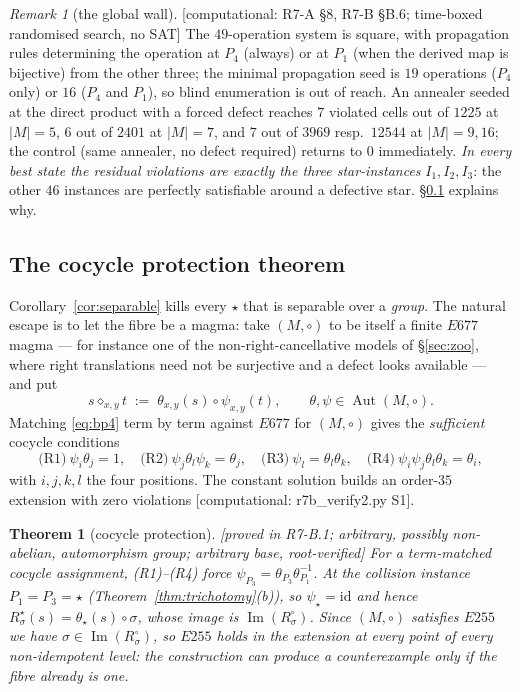 \documentclass[11pt]{article}
\theoremstyle{plain}
\newtheorem{theorem}{Theorem}[section]
\theoremstyle{definition}
\theoremstyle{remark}
\newtheorem*{remark*}{Remark}
\numberwithin{equation}{section}
\newcommand{\Imm}{\operatorname{Im}}
\newcommand{\Aut}{\operatorname{Aut}}
\newcommand{\statusbox}[1]{{\small\sloppy\textsf{[#1]}}}
\newcommand{\PROVED}[1]{\statusbox{proved in #1, root-verified}}
\newcommand{\COMP}[1]{\statusbox{computational: #1}}
\begin{document}
\begin{remark*}[the global wall]
\COMP{R7-A \S8, R7-B \S B.6; time-boxed randomised search, no SAT}
The $49$-operation system is square, with propagation rules determining the
operation at $P_4$ (always) or at $P_1$ (when the derived map is bijective) from
the other three; the minimal propagation seed is $19$ operations ($P_4$ only) or
$16$ ($P_4$ and $P_1$), so blind enumeration is out of reach. An annealer seeded
at the direct product with a forced defect reaches $7$ violated cells out of
$1225$ at $|M|=5$, $6$ out of $2401$ at $|M|=7$, and $7$ out of $3969$ resp.\
$12544$ at $|M| = 9,16$; the control (same annealer, no defect required) returns
to $0$ immediately. \emph{In every best state the residual violations are exactly
the three star-instances} $I_1,I_2,I_3$: the other $46$ instances are perfectly
satisfiable around a defective star. \S\ref{sec:cocycle} explains why.
\end{remark*}

\subsection{The cocycle protection theorem}\label{sec:cocycle}

Corollary~\ref{cor:separable} kills every $\star$ that is separable over a
\emph{group}. The natural escape is to let the fibre be a magma: take $(M,\circ)$
to be itself a finite $E677$ magma --- for instance one of the
non-right-cancellative models of \S\ref{sec:zoo}, where right translations need
not be surjective and a defect looks available --- and put
\[
  s\diamond_{x,y}t \;:=\; \theta_{x,y}(s)\circ\psi_{x,y}(t),
  \qquad \theta,\psi\in\Aut(M,\circ).
\]
Matching \eqref{eq:bp4} term by term against $E677$ for $(M,\circ)$ gives the
\emph{sufficient} cocycle conditions
\[
  \text{(R1)}\ \psi_i\theta_j = 1,\quad
  \text{(R2)}\ \psi_j\theta_l\psi_k = \theta_j,\quad
  \text{(R3)}\ \psi_l = \theta_l\theta_k,\quad
  \text{(R4)}\ \psi_i\psi_j\theta_l\theta_k = \theta_i,
\]
with $i,j,k,l$ the four positions. The constant solution builds an order-$35$
extension with zero violations \COMP{r7b\_verify2.py S1}.

\begin{theorem}[cocycle protection]\label{thm:cocycle}
\PROVED{R7-B.1; arbitrary, possibly non-abelian, automorphism group; arbitrary base}
For a term-matched cocycle assignment, (R1)--(R4) force
$\psi_{P_3} = \theta_{P_3}\theta_{P_1}^{-1}$. At the collision instance
$P_1 = P_3 = \star$ (Theorem~\ref{thm:trichotomy}(b)), so $\psi_\star = \mathrm{id}$
and hence $R^\star_\sigma(s) = \theta_\star(s)\circ\sigma$, whose image is
$\Imm(R^\circ_\sigma)$. Since $(M,\circ)$ satisfies $E255$ we have
$\sigma\in\Imm(R^\circ_\sigma)$, so $E255$ holds in the extension at every point
of every non-idempotent level: \emph{the construction can produce a counterexample
only if the fibre already is one}.
\end{theorem}
\end{document}

